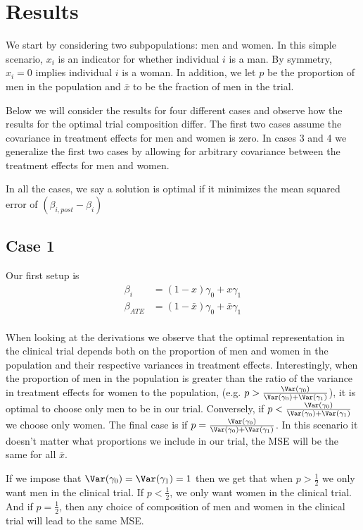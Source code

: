 \section{Results}


We start by considering two subpopulations: men and women. In this simple scenario, $x_i$ is an indicator for whether individual $i$ is a man.  
By symmetry, $x_i=0$ implies individual $i$ is a woman.
In addition, we let $p$ be the proportion of men in the population and $\bar{x}$ to be the fraction of men in the trial. 

Below we will consider the results for four different cases and observe how the results for the optimal trial composition differ. The first two cases assume the covariance in treatment effects for men and women is zero.
In cases 3 and 4 we generalize the first two cases by allowing for arbitrary covariance between the treatment effects for men and women.


In all the cases, we say a solution is optimal if it minimizes the mean squared error of 
$(\beta_{i,post} - \beta_{i})$

\subsection*{Case 1}
Our first setup is
\begin{align*}
	\beta_i &= (1 - x) \gamma_0 + x \gamma_1 \\
	\beta_{ATE} &= (1 - \bar{x}) \gamma_0 + \bar{x} \gamma_1 \\
\end{align*}

When looking at the derivations we observe that the optimal representation in the clinical trial depends both on the proportion of men and women in the population and their respective variances in treatment effects.
Interestingly, when the proportion of men in the population is greater than the ratio of the variance in treatment effects for women to the population, (e.g.
$p > \frac{\Var(\gamma_0)}{ \Var(\gamma_0) + \Var(\gamma_1)}$), it is optimal to choose only men to be in our trial. 
Conversely, if $p < \frac{\Var(\gamma_0)}{ \Var(\gamma_0) + \Var(\gamma_1)}$ we choose only women.
The final case is if $p = \frac{\Var(\gamma_0)}{ \Var(\gamma_0) + \Var(\gamma_1)}$. 
In this scenario it doesn't matter what proportions we include in our trial, the MSE will be the same for all $\bar{x}$.

If we impose that $\Var(\gamma_0) = \Var(\gamma_1) = 1$ then we get that when $p > \frac{1}{2}$ we only want men in the clinical trial.
If $p < \frac{1}{2}$, we only want women in the clinical trial. And if $p = \frac{1}{2}$, then any choice of composition of men and women in the clinical trial will lead to the same MSE.

